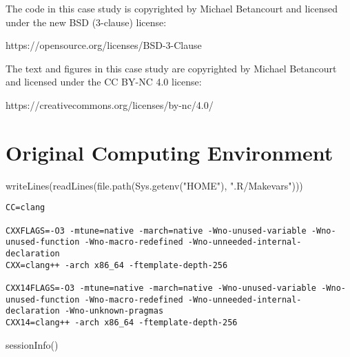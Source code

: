 \documentclass[
  letterpaper,
  DIV=11,
  numbers=noendperiod]{scrartcl}
\newenvironment{Shaded}{\begin{snugshade}}{\end{snugshade}}
\newcommand{\FunctionTok}[1]{\textcolor[rgb]{0.28,0.35,0.67}{#1}}
\newcommand{\NormalTok}[1]{\textcolor[rgb]{0.00,0.23,0.31}{#1}}
\newcommand{\StringTok}[1]{\textcolor[rgb]{0.13,0.47,0.30}{#1}}
\begin{document}
The code in this case study is copyrighted by Michael Betancourt and
licensed under the new BSD (3-clause) license:

https://opensource.org/licenses/BSD-3-Clause

The text and figures in this case study are copyrighted by Michael
Betancourt and licensed under the CC BY-NC 4.0 license:

https://creativecommons.org/licenses/by-nc/4.0/

\section*{Original Computing
Environment}\label{original-computing-environment}

\begin{Shaded}
\begin{Highlighting}[]
\FunctionTok{writeLines}\NormalTok{(}\FunctionTok{readLines}\NormalTok{(}\FunctionTok{file.path}\NormalTok{(}\FunctionTok{Sys.getenv}\NormalTok{(}\StringTok{"HOME"}\NormalTok{), }\StringTok{".R/Makevars"}\NormalTok{)))}
\end{Highlighting}
\end{Shaded}

\begin{verbatim}
CC=clang

CXXFLAGS=-O3 -mtune=native -march=native -Wno-unused-variable -Wno-unused-function -Wno-macro-redefined -Wno-unneeded-internal-declaration
CXX=clang++ -arch x86_64 -ftemplate-depth-256

CXX14FLAGS=-O3 -mtune=native -march=native -Wno-unused-variable -Wno-unused-function -Wno-macro-redefined -Wno-unneeded-internal-declaration -Wno-unknown-pragmas
CXX14=clang++ -arch x86_64 -ftemplate-depth-256
\end{verbatim}

\begin{Shaded}
\begin{Highlighting}[]
\FunctionTok{sessionInfo}\NormalTok{()}
\end{Highlighting}
\end{Shaded}
\end{document}
